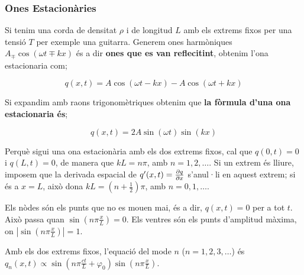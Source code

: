 \documentclass[12pt]{article}
\begin{document}
\subsubsection{Ones Estacionàries}

Si tenim una corda de densitat $\rho$ i de longitud $L$ amb els extrems fixos per una tensió $T$ per exemple una guitarra. Generem ones harmòniques $A_{\mp}\cos(\omega t \mp kx)$ és a dir \textbf{ones que es van reflecitint}, obtenim l'ona estacionaria com;

\[q(x,t) = A\cos(\omega t -kx) - A\cos(\omega t + kx)\]

Si expandim amb raons trigonomètriques obtenim que \textbf{la fòrmula d'una ona estacionaria és};

\[q(x,t) = 2A\sin(\omega t)\sin(kx)\]

Perquè sigui una ona estacionària amb els dos extrems fixos, cal que $q(0,t)=0$ i $q(L,t)=0$, de manera que $kL=n\pi$, amb $n=1,2,\ldots$. Si un extrem és lliure, imposem que la derivada espacial de $q'(x,t) = \pdv{q}{x}$ s'anul·li en aquest extrem; si és a $x=L$, això dona $kL=(n+\tfrac{1}{2})\pi$, amb $n=0,1,\ldots$.

Els nòdes són els punts que no es mouen mai, és a dir, $q(x,t)=0$ per a tot $t$. Això passa quan $\sin(n\pi\frac{x}{L})=0$. Els ventres són els punts d'amplitud màxima, on $\left|\sin\!\left(n\pi\frac{x}{L}\right)\right|=1$.

\begin{center}
\end{center}

Amb els dos extrems fixos, l'equació del mode $n$ ($n=1,2,3,\dots$) és
$q_n(x,t) \propto \sin\!\left(n\pi\frac{ct}{L} + \varphi_0\right) \sin\!\left(n\pi\frac{x}{L}\right)$.
\end{document}
